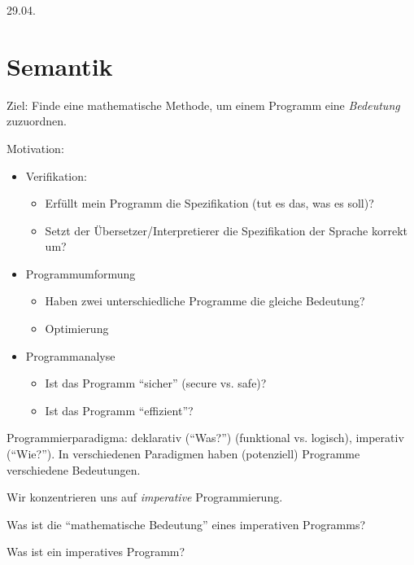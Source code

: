 \hfill 29.04.

\section{Semantik}


Ziel: Finde eine mathematische Methode, um einem Programm eine \emph{Bedeutung} zuzuordnen.

Motivation:
\begin{itemize}
    \item Verifikation:
        \begin{itemize}
            \item Erfüllt mein Programm die Spezifikation (tut es das, was es soll)?
            \item Setzt der Übersetzer/Interpretierer die Spezifikation der Sprache korrekt um?
        \end{itemize}
     \item Programmumformung
        \begin{itemize}
            \item Haben zwei unterschiedliche Programme die gleiche Bedeutung?
            \item Optimierung
        \end{itemize}
    \item Programmanalyse
        \begin{itemize}
            \item Ist das Programm ``sicher'' (secure vs. safe)?
            \item Ist das Programm ``effizient''?
        \end{itemize}
\end{itemize}

\begin{definition}[Programmierparadigma]
    Programmierparadigma: \zb deklarativ (``Was?'') (funktional vs. logisch), imperativ (``Wie?''). In verschiedenen Paradigmen haben (potenziell) Programme verschiedene Bedeutungen.
\end{definition}

Wir konzentrieren uns auf \emph{imperative} Programmierung.

\begin{question}
    Was ist die ``mathematische Bedeutung'' eines imperativen Programms?
\end{question}

\begin{question}[folgend]
    Was ist ein imperatives Programm?
\end{question}




